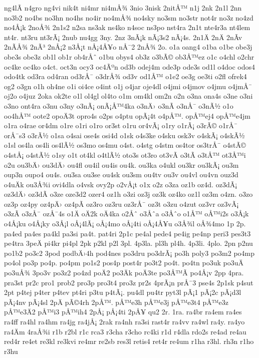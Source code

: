 {ng4lÃ­
n4gro
ng4vi
nik4t
ni4mr
ni4mÅ¾
3nio
3nisk
2nitÅ™
n1j
2nk
2n1l
2nn
no3b2
no4bs
no3hn
no4hs
no4ir
no4mÅ¾
no4sky
no3sm
no3str
not4r
no3z
no4zd
no4Å¡k
2noÅ¾
2n1s2
n2sa
ns3ak
ns4ko
n4soc
ns3po
nst4ra
2n1t
nte4r3a
nt4lem
nt4r.
nt3ru
nt3rÃ¡
2nub
nu4gg
3ny.
2nz
3nÃ¡k
nÃ¡3s2
nÃ¡4s.
2n1Ä
2nÄ
2nÃ­v
2nÃ­Å¾
2nÃ³
2nÅ¡2
n3Å¡t
nÅ¡4Å¥o
nÅ¯2
2nÅ¾
2o.
o1a
oang4
o1ba
o1be
obe3j
obe3s
obe3z
ob1l
ob1r
ob4rÅˆ
o1bu
obys4
ob3z
o3bÃ©
ob3Å™ez
o1c
o4chl
o2chr
oc4ke
oc4ko
o4ct.
oct3n
ocy3
oc4Ãºn
od3b
odej4m
ode3p
ode3s
od1l
o4doc
odos4
odo4tk
od3ra
od4ran
od3rÅ¯
o3drÅ¾
od3v
od1Å™
o1e2
oe3g
oe3ti
o2fl
ofrek4
og2
o3gn
o1h
oh4ne
o1i
oi4ce
o4int
o1j
o4jar
oje4dl
o4jmi
o4jmov
o4jmu
o4jmÅ¯
oj2o
o4juz
2oka
ok2te
o1l
ol4gl
ol4to
o1m
om4kl
om2n
o2n
o3na
ona4s
o3ne
o3ni
o3no
ont4ra
o3nu
o3ny
o3nÃ¡
onÃ¡Å™4ka
o3nÄ›
o3nÃ­
o3nÅ¯
o3nÃ½
o1o
oo4hÅ™
oote2
opoÄ3t
opro4s
o2ps
o4ptu
opÃ¡4t
o4pÅ™.
opÅ™ej4
opÅ™e4jm
o1ra
o4rae
or4dm
o1re
o1ri
o1ro
or3st
o1ru
or4vÃ¡
o1ry
o1rÃ¡
o3rÃ©
o1rÅ¯
orÅ¯s3
o3rÃ½
o1sa
o4sai
ose4s
osi4d
o1sk
o4s3ke
o4sku
osk3v
o4skÃ¡
o4skÃ½
o1sl
os4la
os4li
os4lÃ½
os3mo
os4mu
o4st.
o4stg
o4stm
os4tor
os3trÅ¯
o4stÃ©
o4stÅ¡
o4stÃ½
o1sy
o1t
ot4kl
o4tlÃ½
oto3s
ot3ro
ot3vÃ­
o3tÃ­
o3tÅ™
ot3Å™i
o2u
ou3bÄ›
ou3dÄ›
ou4fl
ou4il
ou4is
ou4k.
ou3ka
o4ukl
ou3kr
ou3kÃ¡
ou3m
oup3n
oupo4
ou4s.
ou3sa
ou3se
ou4sk
ou3sm
ou4tv
ou3v
ou4vl
ou4vn
ouz3d
o4uÄk
ou3Å¾i
ovi4dla
o4vsk
ovy2p
o2vÅ¡t
o1x
o2z
o3za
oz1b
oz4d.
oz3dÃ¡
oz3dÄ›
oz3dÃ­
o3ze
oze3d2
ozer4
oz1h
o3zi
oz3j
oz3k
oz4ko
oz1l
oz3m
o4zn.
o3zo
oz3p
oz4py
oz4pÄ›
oz4pÃ­
oz3ro
oz3ru
oz3rÅ¯
oz3t
o3zu
o4zut
oz3vr
oz3vÃ¡
o3zÃ­
o3zÅ¯
ozÅ¯4s
o1Ä
oÄ2k
oÄ4ka
o2Åˆ
o3Åˆa
o3Åˆo
o1Å™
oÅ™i2s
o3Å¡k
o4Å¡ku
o4Å¡ky
o3Å¡l
oÅ¡4lÃ¡
oÅ¡4mo
oÅ¡4ti
oÅ¡4Å¥u
o3Å¾l
oÅ¾4mo
1p
2p.
pa4ed
pa4es
pa4kl
pa3si
pa4t.
pat4ri
2p1c
pe4al
pede4
pe4ig
pe4np
peri3
pes3t3
pe4tra
3peÄ
pi4kr
pi4pl
2pk
p2kl
p2l
3pl.
4p3la.
pl3h
pl4h.
4p3li.
4plo.
2pn
p2nu
po1b2
po3c2
3pod
podbÄ›4h
pod4nes
po3dru
po3drÃ¡
po3h
poly3
po3m2
po4mp
po4ol
po3p
po4p.
po4pm
po1s2
pos4p
post4r
po3t2
po4t.
po4tn
po3uk
po3uÄ
po3uÅ¾
3po3v
po3z2
po4zd
poÄ2
po3Äk
poÄ3te
po3Å™Ã­
po4Å¡v
2pp
4pra.
pra3st
pr2c
pro1
prob2
pro3p
pro3t4
pro3z
pr2s
4prÃ¡n
prÅ¯3
pse4s
2p1sk
p4sut
2pt
p4tej
p4ter
p4tev
pt4ri
p3tu
p4tÃ¡.
pu4dl
pu4tr
pyt3l
pÃ¡1
pÃ¡2c
pÃ¡d3l
pÃ¡4nv
pÃ¡4sl
2pÄ
pÃ©4rh
2pÅ™.
pÅ™e3h
pÅ™e3j
pÅ™e3t4
pÅ™e3z
pÅ™e3Ä2
pÅ™i3
pÅ™ih4
2pÅ¡
pÅ¡4ti
2pÅ¥
qu2
2r.
1ra.
ra4br
ra4em
ra4es
ra4ff
ra4hl
ra4hm
ra4jg
ra4jÅ¡
2rak
ra4nh
ra3si
rast4r
ra4vv
ra4wl
ra4y.
ra4yo
ra4Äm
4raÅ¾i
r1b
r2bl
r1c
rca3
r3cha
r3cho
rc4ki
r1d
r4dla
rdo2s
re4ad
re4au
red4r
re4et
re3kl
re3kvi
re4mr
re2sb
res3l
retis4
ret4r
re4um
r1ha
r3hl.
rh3n
r1ho
r3hu
}
